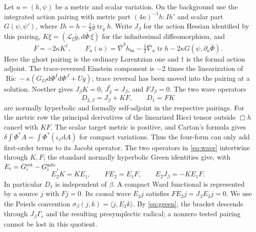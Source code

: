 \documentclass[11pt]{article}
\newcommand{\dd}{\mathrm d}
\newcommand{\tr}{\operatorname{tr}}
\newcommand{\Lie}{\mathcal L}
\begin{document}
Let $u=(h,\psi)$ be a metric and scalar variation. On the background use the integrated action pairing with metric part $(4\kappa)^{-1}h:Ih'$ and scalar part $G(\psi,\psi')$, where $Ih=h-\frac12\bar g\tr_{\bar g}h$. Write $J_\beta$ for the action Hessian identified by this pairing, $K\xi=(\Lie_\xi\bar g,\dd\bar\Phi\,\xi)$ for the infinitesimal diffeomorphism, and
\[
 F=-2\kappa K^\dagger,
 \qquad F_a(u)=\bar\nabla^bh_{ba}-\tfrac12\bar\nabla_a\tr h
                          -2\kappa G(\psi,\partial_a\bar\Phi).
\]
Here the ghost pairing is the ordinary Lorentzian one and $\dagger$ is the formal action adjoint. The trace-reversed Einstein component is $-2$ times the linearization of $\operatorname{Ric}-\kappa(G_{IJ}\dd\Phi^I\dd\Phi^J+Ug)$; trace reversal has been moved into the pairing at a solution. Noether gives $J_\beta K=0$, $J_\beta^\dagger=J_\beta$, and $FJ_\beta=0$. The two wave operators
\begin{equation}\label{eq:wave}
 D_{2,\beta}=J_\beta+KF,\qquad D_1=FK
\end{equation}
are normally hyperbolic and formally self-adjoint in the respective pairings. For the metric row the principal derivatives of the linearized Ricci tensor outside $\bar\Box h$ cancel with $KF$. The scalar target metric is positive, and Cartan's formula gives $\delta\int\Phi^* A=\int\Phi^*(\iota_\psi\dd A)$ for compact variations. Thus the four-form can only add first-order terms to its Jacobi operator. The two operators in \eqref{eq:wave} intertwine through $K,F$; the standard normally hyperbolic Green identities give, with $E_i=G_i^{\rm ret}-G_i^{\rm adv}$,
\begin{equation}\label{eq:green}
 E_2K=KE_1,\qquad FE_2=E_1F,\qquad E_2J_\beta=-KE_1F.
\end{equation}
In particular $D_1$ is independent of $\beta$. A compact Ward functional is represented by a source $j$ with $Fj=0$. Its causal wave $E_2j$ satisfies $F E_2j=J_\beta E_2j=0$. We use the Peierls convention $\sigma_\beta(j,k)=\langle j,E_2k\rangle$. By \eqref{eq:green}, the bracket descends through $J_\beta\Gamma_c$ and the resulting presymplectic radical; a nonzero tested pairing cannot be lost in this quotient.
\end{document}
